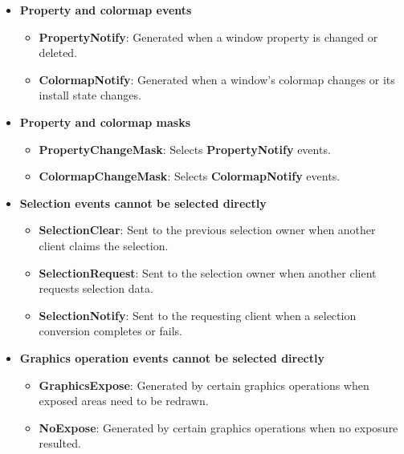 \documentclass{report}
\begin{document}
\begin{itemize}
\begin{itemize}
                \item \textbf{ResizeRedirectMask}: Selects \textbf{ResizeRequest} events.
            \end{itemize}
        \item \textbf{Property and colormap events}
            \bigbreak \noindent
            \begin{itemize}
                \item \textbf{PropertyNotify}: Generated when a window property is changed or deleted.
                \item \textbf{ColormapNotify}: Generated when a window's colormap changes or its install state changes.
            \end{itemize}
        \item \textbf{Property and colormap masks}
            \bigbreak \noindent
            \begin{itemize}
                \item \textbf{PropertyChangeMask}: Selects \textbf{PropertyNotify} events.
                \item \textbf{ColormapChangeMask}: Selects \textbf{ColormapNotify} events.
            \end{itemize}
        \item \textbf{Selection events cannot be selected directly}
            \bigbreak \noindent
            \begin{itemize}
                \item \textbf{SelectionClear}: Sent to the previous selection owner when another client claims the selection.
                \item \textbf{SelectionRequest}: Sent to the selection owner when another client requests selection data.
                \item \textbf{SelectionNotify}: Sent to the requesting client when a selection conversion completes or fails.
            \end{itemize}
        \item \textbf{Graphics operation events cannot be selected directly}
            \bigbreak \noindent
            \begin{itemize}
                \item \textbf{GraphicsExpose}: Generated by certain graphics operations when exposed areas need to be redrawn.
                \item \textbf{NoExpose}: Generated by certain graphics operations when no exposure resulted.
            \end{itemize}

\end{itemize}
\end{document}
